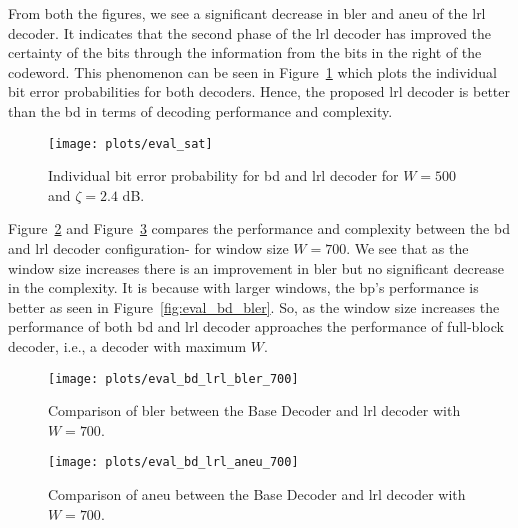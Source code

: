 From both the figures, we see a significant decrease in \gls{bler} and \gls{aneu} of the \gls{lrl} decoder. It indicates that the second phase of the \gls{lrl} decoder has improved the certainty of the bits through the information from the bits in the right of the codeword. This phenomenon can be seen in Figure~\ref{fig:eval_bd_lrl_iber} which plots the individual bit error probabilities for both decoders. Hence, the proposed \gls{lrl} decoder is better than the \gls{bd} in terms of decoding performance and complexity.
\begin{figure}[htbp]
  \centering
  \texttt{[image: plots/eval\_sat]}
  \caption{Individual bit error probability for \gls{bd} and \gls{lrl} decoder for $W=500$ and $\zeta=2.4$ dB.}
  \label{fig:eval_bd_lrl_iber}
\end{figure}

Figure~\ref{fig:eval_bd_lrl_bler_700} and Figure~\ref{fig:eval_bd_lrl_aneu_700} compares the performance and complexity between the \gls{bd} and \gls{lrl} decoder configuration- for window size $W=700$. We see that as the window size increases there is an improvement in \gls{bler} but no significant decrease in the complexity. It is because with larger windows, the \gls{bp}'s performance is better as seen in Figure~\ref{fig:eval_bd_bler}. So, as the window size increases the performance of both \gls{bd} and \gls{lrl} decoder approaches the performance of full-block decoder, i.e., a decoder with maximum $W$.
\begin{figure}[htbp]
  \centering
  \texttt{[image: plots/eval\_bd\_lrl\_bler\_700]}
  \caption{Comparison of \gls{bler} between the Base Decoder and \gls{lrl} decoder with $W=700$.}
  \label{fig:eval_bd_lrl_bler_700}
\end{figure}
\begin{figure}[htbp]
  \centering
  \texttt{[image: plots/eval\_bd\_lrl\_aneu\_700]}
  \caption{Comparison of \gls{aneu} between the Base Decoder and \gls{lrl} decoder with $W=700$.}
  \label{fig:eval_bd_lrl_aneu_700}
\end{figure}

